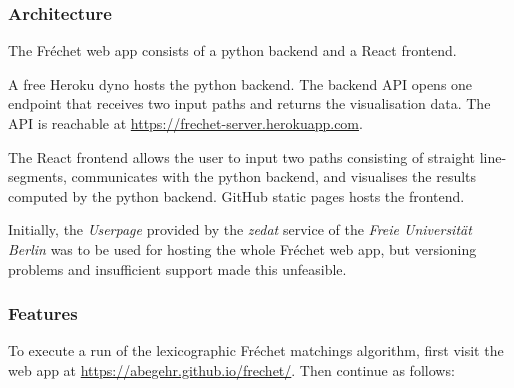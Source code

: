 \subsubsection{Architecture}

The Fréchet web app consists of a python backend and a React frontend.\

A free Heroku dyno hosts the python backend. The backend API opens one endpoint that receives two input paths and returns the visualisation data. The API is reachable at \url{https://frechet-server.herokuapp.com}.\

The React frontend allows the user to input two paths consisting of straight line-segments, communicates with the python backend, and visualises the results computed by the python backend. GitHub static pages hosts the frontend.\

Initially, the \textit{Userpage} provided by the \textit{zedat} service of the \textit{Freie Universität Berlin} was to be used for hosting the whole Fréchet web app, but versioning problems and insufficient support made this unfeasible.

\subsubsection{Features}

To execute a run of the lexicographic Fréchet matchings algorithm, first visit the web app at \url{https://abegehr.github.io/frechet/}. Then continue as follows:

